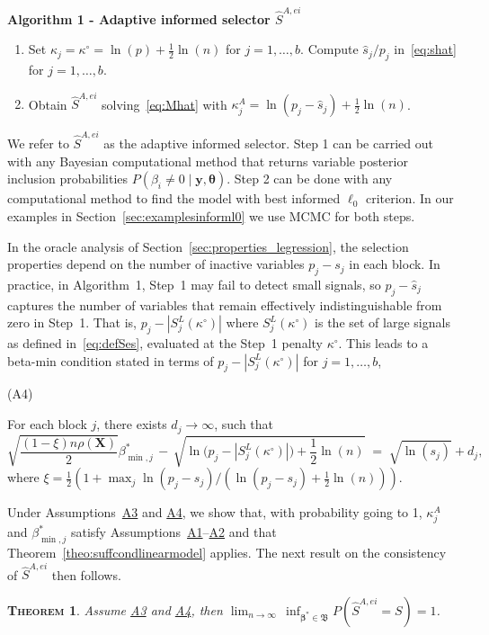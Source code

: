 \documentclass[
  12pt]{article}
\providecommand{\tightlist}{%
  \setlength{\itemsep}{0pt}\setlength{\parskip}{0pt}}\usepackage{longtable,booktabs,array}
\newcommand{\by}{\mathbf{y}}
\newcommand{\bbeta}{\boldsymbol{\beta}}
\newcommand{\btheta}{\boldsymbol{\theta}}
\newcommand{\bX}{\mathbf{X}}
\newtheorem{thm}{\textsc{Theorem}}[section]
\begin{document}
\textbf{\hypertarget{lab:AlgoAIS}{Algorithm 1} - Adaptive informed selector $\hat{S}^{A,ei}$}
\begin{enumerate}\tightlist
    \item Set $\kappa_j=\kappa^{\circ}=\ln(p)+\frac{1}{2}\ln(n)$ 
    for $j=1,\ldots,b$. Compute $\hat{s}_j/p_j$ in~\eqref{eq:shat} for $j=1,\ldots,b$.
    \item Obtain $\hat{S}^{A,ei}$ solving~\eqref{eq:Mhat} with
    $\kappa_j^{A} = \ln(p_j-\hat{s}_j)+ \tfrac{1}{2}\ln(n)$.
\end{enumerate}

We refer to $\hat{S}^{A,ei}$ as the adaptive informed selector. 
Step 1 can be carried out with any Bayesian computational method that returns variable posterior inclusion probabilities $P(\beta_i \neq 0 \mid \by, \btheta)$. 
Step 2 can be done with any computational method to find the model with best informed $\ell_0$ criterion.
In our examples in Section~\ref{sec:examplesinforml0} we use MCMC for both steps. 

In the oracle analysis of Section~\ref{sec:properties_legression}, the selection properties depend on the number of inactive variables $p_j-s_j$ in each block. In practice, in Algorithm~1, Step~1 may fail to detect small signals, so $p_j - \hat{s}_j$ captures the number of variables that remain effectively indistinguishable from zero in Step~1. That is, $p_j-|S_j^{L}(\kappa^\circ)|$ where $S_j^{L}(\kappa^\circ)$ is the set of large signals as defined in~\eqref{eq:defSes}, evaluated at the Step~1 penalty $\kappa^\circ$.
This leads to a beta-min condition stated in terms of $p_j-|S_j^{L}(\kappa^\circ)|$ for $j=1,\ldots,b$,

\hypertarget{lab:A4}{(A4)}\quad For each block $j$, there exists $d_j\to\infty$, such that
\begin{equation*}
        \sqrt{\frac{ (1-\xi)n\rho(\bX)}{2}}\beta_{\min,j}^* \,- \,\sqrt{\ln\big(p_j-|S^{L}_j(\kappa^{\circ})|\big)+\frac12\ln(n)} \;=\; \sqrt{\ln(s_j)} + d_j,
    \end{equation*}
where $\xi=\tfrac12(1+\max_j \ln(p_j-s_j)/(\ln(p_j-s_j)+\tfrac 12 \ln(n)))$.

Under Assumptions~\hyperlink{lab:A3}{A3} and \hyperlink{lab:A4}{A4}, we show that, with probability going to 1, $\kappa^{A}_j$ and $\beta_{\min,j}^*$ satisfy Assumptions~\hyperlink{lab:A1}{A1}--\hyperlink{lab:A2}{A2} and that Theorem~\ref{theo:suffcondlinearmodel} applies. The next result on the consistency of $\hat{S}^{A,ei}$ then follows.
\begin{thm}\label{theo:informedl0consist}
    Assume \hyperlink{lab:A3}{A3} and \hyperlink{lab:A4}{A4}, then 
$\lim_{n \to \infty} \,\inf_{\bbeta^*\in\mathfrak{B}} P(\hat{S}^{A,ei} = S) = 1$.
\end{thm}
\end{document}
